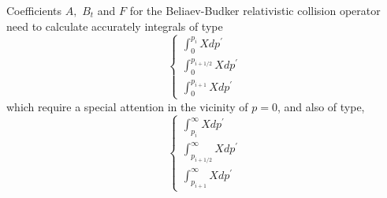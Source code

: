 Coefficients $A,$ $B_{t}$ and $F$ for the Beliaev-Budker relativistic
collision operator need to calculate accurately integrals of type
\begin{equation}
\left\{
\begin{array}{l}
\int_{0}^{p_{i}}Xdp^{\prime } \\
\int_{0}^{p_{i+1/2}}Xdp^{\prime } \\
\int_{0}^{p_{i+1}}Xdp^{\prime }
\end{array}
\right.
\end{equation}
which require a special attention in the vicinity of $p=0$, and also of
type,
\begin{equation}
\left\{
\begin{array}{l}
\int_{p_{i}}^{\infty }Xdp^{\prime } \\
\int_{p_{i+1/2}}^{\infty }Xdp^{\prime } \\
\int_{p_{i+1}}^{\infty }Xdp^{\prime }
\end{array}
\right.
\end{equation}

